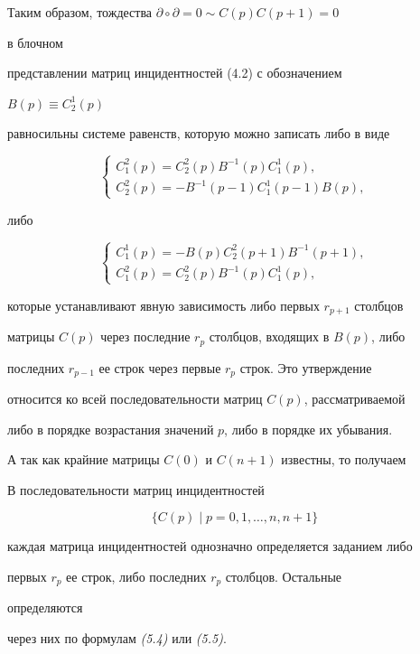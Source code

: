 Таким образом, тождества $\partial\circ\partial=0\sim C(p)C(p+1)=0$ 


в блочном 


представлении матриц инцидентностей (4.2) с обозначением 


$B(p)\equiv C^1_2(p)$ 


равносильны системе равенств, которую можно записать либо в виде 


\begin{equation} 


\begin{cases} 


C^2_1(p)=C^2_2(p)B^{-1}(p)C^1_1(p),\\ 


C^2_2(p)=-B^{-1}(p-1)C^1_1(p-1)B(p), 


\end{cases} 


\end{equation} 


либо


\begin{equation} 


\begin{cases} 


C^1_1(p)=-B(p)C^2_2(p+1)B^{-1}(p+1),\\ 


C^2_1(p)=C^2_2(p)B^{-1}(p)C^1_1(p), 


\end{cases} 


\end{equation} 


которые устанавливают явную зависимость либо первых $r_{p+1}$ столбцов 


матрицы $C(p)$ через последние $r_p$ столбцов, входящих в $B(p)$, либо 


последних $r_{p-1}$ ее строк через первые $r_p$ строк. Это утверждение 


относится ко всей последовательности матриц $C(p)$, рассматриваемой 


либо в порядке возрастания значений $p$, либо в порядке их убывания. 


А так как крайние матрицы $C(0)$ и $C(n+1)$ известны, то получаем 


 


\begin{prop} В последовательности матриц инцидентностей 


$$ 


\{C(p)\mid p=0,1,\dotsc,n,n+1\} 


$$ 


каждая матрица инцидентностей однозначно определяется заданием либо 


первых $r_p$ ее строк, либо последних $r_p$ столбцов. Остальные 


определяются 


через них по формулам {\em (5.4)} или {\em (5.5)}. 


\end{prop} 


